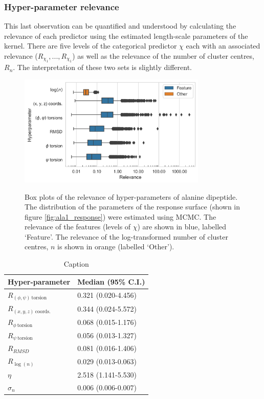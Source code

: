 \subsubsection{Hyper-parameter relevance}\label{subsubsec:ala_relevance}
This last observation can be quantified and understood by calculating the relevance of each predictor using the estimated length-scale parameters of the kernel. There are five levels of the categorical predictor $\chi$ each with an associated relevance ($R_{\chi_{1}}, ..., R_{\chi_{1}}$) as well as the relevance of the number of cluster centres, $R_{n}$. The interpretation of these two sets is slightly different. 

\begin{figure}
    \centering
    \caption{Box plots of the relevance of hyper-parameters of alanine dipeptide. The distribution of the parameters of the response surface (shown in figure \ref{fig:ala1_response}) were estimated using MCMC. The relevance of the features (levels of $\chi$) are shown in blue, labelled `Feature'. The relevance of the log-transformed number of cluster centres, $n$ is shown in orange (labelled `Other').}
    \includegraphics[width=0.8\textwidth]{chapters/msm_optimization/figures/ala1_relevance.png}
    \label{fig:ala1_relevance}
\end{figure}

\begin{table}
    \centering
    \caption{Caption}
    \begin{tabular}{|l|l|}
    \hline
                          Hyper-parameter &    Median (95\% C.I.) \\
    \hline\hline
     $R_{(\phi, \psi)\ \mathrm{torsion}}$ &  0.321 (0.020-4.456) \\
        $R_{(x, y, z)\ \mathrm{coords.}}$ &  0.344 (0.024-5.572) \\
             $R_{\phi\ \mathrm{torsion}}$ &  0.068 (0.015-1.176) \\
             $R_{\psi\ \mathrm{torsion}}$ &  0.056 (0.013-1.327) \\
                               $R_{RMSD}$ &  0.081 (0.016-1.406) \\
                          $R_{\log{(n)}}$ &  0.029 (0.013-0.063) \\
                                   $\eta$ &  2.518 (1.141-5.530) \\
                               $\sigma_n$ &  0.006 (0.006-0.007) \\
    \hline
    \end{tabular}
    \label{tab:ala1_rel_post}
\end{table}


